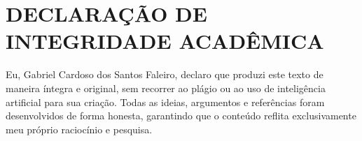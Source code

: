 \documentclass[
    article,            %
	12pt,				%
	oneside,			%
	a4paper,			%
	chapter=TITLE,		%
	section=TITLE,		%
	english,			%
	french,				%
	spanish,			%
	brazil				%
	]{abntex2}
\begin{document}
\pagebreak
\section{DECLARAÇÃO DE INTEGRIDADE ACADÊMICA}
Eu, Gabriel Cardoso dos Santos Faleiro, declaro que produzi este texto de maneira íntegra e original, sem recorrer ao plágio ou ao uso de inteligência artificial para sua criação. Todas as ideias, argumentos e referências foram desenvolvidos de forma honesta, garantindo que o conteúdo reflita exclusivamente meu próprio raciocínio e pesquisa.
\pagebreak

\nocite{BIBLIA}
\nocite{EDILSON}
\renewcommand{\bibname}{{REFER\^ENCIAS}}

\end{document}
